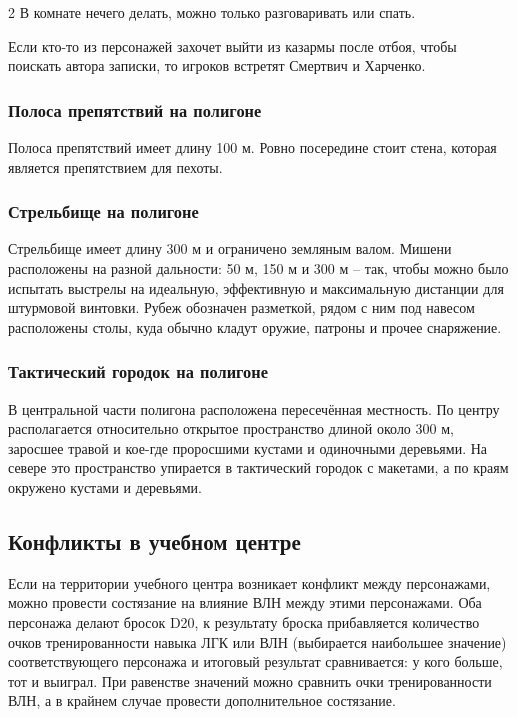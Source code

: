 \documentclass[twoside]{article}
\begin{document}
\begin{multicols}{2}
В комнате нечего делать, можно только разговаривать или спать.

Если кто-то из персонажей захочет выйти из казармы после отбоя, чтобы
поискать автора записки, то игроков встретят Смертвич и Харченко.

\subsubsection{Полоса препятствий на полигоне}\label{obstacle-course}

Полоса препятствий имеет длину 100 м. Ровно посередине стоит стена,
которая является препятствием для пехоты.

\subsubsection{Стрельбище на полигоне}\label{firing-range}

Стрельбище имеет длину 300 м и ограничено земляным валом. Мишени
расположены на разной дальности: 50 м, 150 м и 300 м -- так, чтобы можно
было испытать выстрелы на идеальную, эффективную и максимальную
дистанции для штурмовой винтовки. Рубеж обозначен разметкой, рядом с ним
под навесом расположены столы, куда обычно кладут оружие, патроны и
прочее снаряжение.

\subsubsection{Тактический городок на полигоне}\label{tactical-village}

В центральной части полигона расположена пересечённая местность. По
центру располагается относительно открытое пространство длиной около 300
м, заросшее травой и кое-где проросшими кустами и одиночными деревьями.
На севере это пространство упирается в тактический городок с макетами, а
по краям окружено кустами и деревьями.

\subsection{Конфликты в учебном центре}\label{training-conflicts}

Если на территории учебного центра возникает конфликт между персонажами,
можно провести состязание на влияние ВЛН между этими
персонажами. Оба персонажа делают бросок D20, к результату броска
прибавляется количество очков тренированности навыка ЛГК или ВЛН
(выбирается наибольшее значение) соответствующего персонажа и итоговый
результат сравнивается: у кого больше, тот и выиграл. При равенстве
значений можно сравнить очки тренированности ВЛН, а в крайнем
случае провести дополнительное состязание.


\end{multicols}
\end{document}
